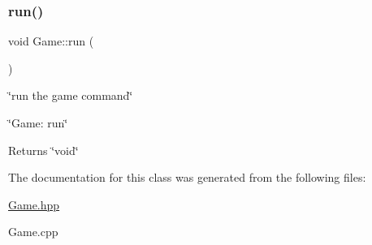 \subsubsection{\texorpdfstring{run()}{run()}}
{\footnotesize\ttfamily void Game\+::run (\begin{DoxyParamCaption}{ }\end{DoxyParamCaption})}



\char`\"{}run the game command\char`\"{} 

\char`\"{}\+Game\+: run\char`\"{}

\begin{DoxyReturn}{Returns}
\char`\"{}void\char`\"{} 
\end{DoxyReturn}


The documentation for this class was generated from the following files\+:\begin{DoxyCompactItemize}
\item 
\hyperlink{Game_8hpp}{Game.\+hpp}\item 
Game.\+cpp\end{DoxyCompactItemize}
